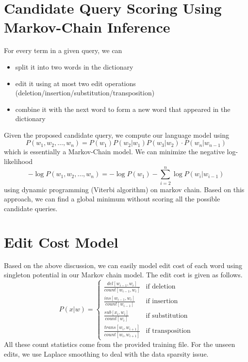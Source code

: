 \section{Candidate Query Scoring Using Markov-Chain Inference}
For every term in a given query, we can
\begin{itemize}
  \item split it into two words in the dictionary
  \item edit it using at most two edit operations (deletion/insertion/substitution/transposition)
  \item combine it with the next word to form a new word that appeared in the dictionary 
\end{itemize}
Given the proposed candidate query, we compute our language model using
\begin{equation}\label{eq:3}
P(w_1, w_2, \dots, w_n) = P(w_1) P(w_2 | w_1) P(w_3 | w_2) \cdot P(w_n | w_{n-1})
\end{equation}
which is essentially a Markov-Chain model. We can minimize the negative log-likelihood
\begin{equation}\label{eq:4}
-\log P(w_1, w_2, \dots, w_n) = -\log P(w_1) - \sum_{i=2}^n \log P(w_i | w_{i-1})
\end{equation}
using dynamic programming (Viterbi algorithm) on markov chain. Based on this approach,
we can find a global minimum without scoring all the possible candidate queries.


\section{Edit Cost Model}
Based on the above discussion, we can easily model edit cost of each word using singleton potential in our Markov chain model. The edit cost is given as follows.
\begin{equation}\label{eq:5}
P(x | w) = \left\{\begin{array}{ll}
\frac{del[w_{i-1}, w_i]}{count[w_{i-1}, w_i]} & \textrm{if deletion} \\
\frac{ins[w_{i-1}, w_i]}{count[w_{i-1}]} & \textrm{if insertion} \\
\frac{sub[x_i, w_i]}{count[w_i]} & \textrm{if substitution} \\
\frac{trans[w_i, w_{i+1}]}{count[w_i, w_{i+1}]} & \textrm{if transposition}
\end{array}\right.
\end{equation}
All these count statistics come from the provided training file. For the unseen edits, we use Laplace smoothing to deal with the data sparsity issue.

